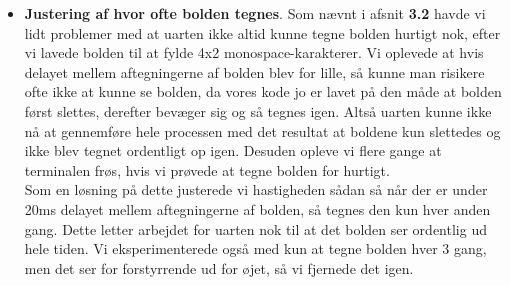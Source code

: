 \begin{itemize}
\item \textbf{Justering af hvor ofte bolden tegnes}. Som nævnt i afsnit \textbf{3.2} havde vi lidt problemer med at uarten ikke altid kunne tegne bolden hurtigt nok, efter vi lavede bolden til at fylde 4x2 monospace-karakterer. Vi oplevede at hvis delayet mellem aftegningerne af bolden blev for lille, så kunne man risikere ofte ikke at kunne se bolden, da vores kode jo er lavet på den måde at bolden først slettes, derefter bevæger sig og så tegnes igen. Altså uarten kunne ikke nå at gennemføre hele processen med det resultat at boldene kun slettedes og ikke blev tegnet ordentligt op igen. Desuden opleve vi flere gange at terminalen frøs, hvis vi prøvede at tegne bolden for hurtigt.\\
Som en løsning på dette justerede vi hastigheden sådan så når der er under 20ms delayet mellem aftegningerne af bolden, så tegnes den kun hver anden gang. Dette letter arbejdet for uarten nok til at det bolden ser ordentlig ud hele tiden. Vi eksperimenterede også med kun at tegne bolden hver 3 gang, men det ser for forstyrrende ud for øjet, så vi fjernede det igen.

\end{itemize}